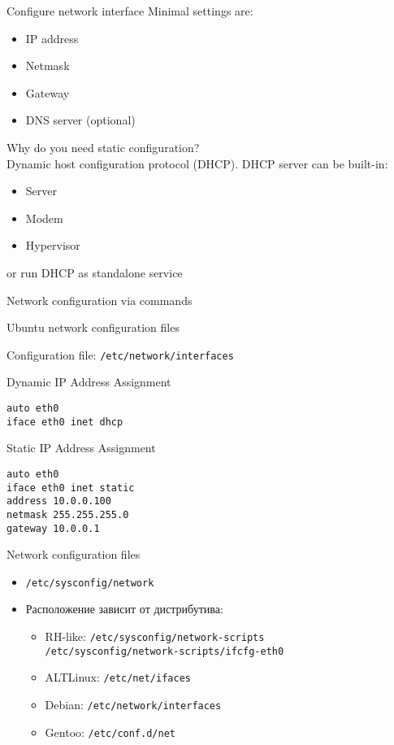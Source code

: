 \begin{frame}{Configure network interface}
Minimal settings are:
  \begin{itemize}
    \item IP address 
    \item Netmask 
	\item Gateway
    \item DNS server (optional)
  \end{itemize}
Why do you need static configuration? \\ 
Dynamic host configuration protocol (DHCP). DHCP server can be built-in:
  \begin{itemize}
	\item Server
    \item Modem 
    \item Hypervisor 
  \end{itemize}
	or run DHCP as standalone service
\end{frame}

\begin{frame}{Network configuration via commands}

\end{frame}

\begin{frame}[fragile]{Ubuntu network configuration files}

Configuration file: {\tt /etc/network/interfaces }

\begin{block}{Dynamic IP Address Assignment}
    \begin{lstlisting}
auto eth0
iface eth0 inet dhcp
    \end{lstlisting}
\end{block}

\begin{block}{Static IP Address Assignment}
    \begin{lstlisting}
auto eth0
iface eth0 inet static
address 10.0.0.100
netmask 255.255.255.0
gateway 10.0.0.1
    \end{lstlisting}
\end{block}
\end{frame}

\begin{frame}{Network configuration files}
  \begin{itemize}
    \item {\tt /etc/sysconfig/network}
    \item Расположение зависит от дистрибутива:
        \begin{itemize}
            \item RH-like: {\tt /etc/sysconfig/network-scripts}\\
                {\tt /etc/sysconfig/network-scripts/ifcfg-eth0}
            \item ALTLinux: {\tt /etc/net/ifaces}
            \item Debian: {\tt /etc/network/interfaces}
            \item Gentoo: {\tt /etc/conf.d/net}
        \end{itemize}
  \end{itemize}
\end{frame}

